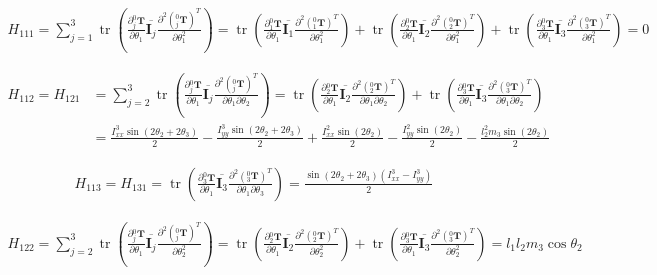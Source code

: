 \documentclass{homework}
\begin{document}
\begin{sol}
\begin{align*}
  H_{111} = \sum_{j=1}^3 \operatorname{tr} (\frac{\partial {^0_j}\mathbf{T}}{\partial \theta_1} \overline{\mathbf{I}_j} \frac{\partial^2 ({^0_j}\mathbf{T})^T}{\partial \theta_1^2}) 
          = \operatorname{tr} (\frac{\partial {^0_1}\mathbf{T}}{\partial \theta_1} \overline{\mathbf{I}_1} \frac{\partial^2 ({^0_1}\mathbf{T})^T}{\partial \theta_1^2}) + \operatorname{tr} (\frac{\partial {^0_2}\mathbf{T}}{\partial \theta_1} \overline{\mathbf{I}_2} \frac{\partial^2 ({^0_2}\mathbf{T})^T}{\partial \theta_1^2}) + \operatorname{tr} (\frac{\partial {^0_3}\mathbf{T}}{\partial \theta_1} \overline{\mathbf{I}_3} \frac{\partial^2 ({^0_3}\mathbf{T})^T}{\partial \theta_1^2})
          = 0
\end{align*}

\begin{align*}
  H_{112} = H_{121} &= \sum_{j=2}^3 \operatorname{tr} (\frac{\partial {^0_j}\mathbf{T}}{\partial \theta_1} \overline{\mathbf{I}_j} \frac{\partial^2 ({^0_j}\mathbf{T})^T}{\partial \theta_1 \partial \theta_2}) 
                    = \operatorname{tr} (\frac{\partial {^0_2}\mathbf{T}}{\partial \theta_1} \overline{\mathbf{I}_2} \frac{\partial^2 ({^0_2}\mathbf{T})^T}{\partial \theta_1 \partial \theta_2}) + \operatorname{tr} (\frac{\partial {^0_3}\mathbf{T}}{\partial \theta_1} \overline{\mathbf{I}_3} \frac{\partial^2 ({^0_3}\mathbf{T})^T}{\partial \theta_1 \partial \theta_2}) \\
                    &= \frac{I_{xx}^3 \sin(2\theta_2 + 2\theta_3)}{2} - \frac{I_{yy}^3 \sin(2\theta_2 + 2\theta_3)}{2} + \frac{I_{xx}^2 \sin(2\theta_2)}{2} - \frac{I_{yy}^2 \sin(2\theta_2)}{2} - \frac{l_2^2 m_3 \sin(2\theta_2)}{2}
\end{align*}

\begin{align*}
  H_{113} = H_{131} = \operatorname{tr} (\frac{\partial {^0_3}\mathbf{T}}{\partial \theta_1} \overline{\mathbf{I}_3} \frac{\partial^2 ({^0_3}\mathbf{T})^T}{\partial \theta_1 \partial \theta_3}) 
                    = \frac{\sin(2\theta_2 + 2\theta_3) (I_{xx}^3 - I_{yy}^3)}{2}
\end{align*}

\begin{align*}
  H_{122} = \sum_{j=2}^3 \operatorname{tr} (\frac{\partial {^0_j}\mathbf{T}}{\partial \theta_1} \overline{\mathbf{I}_j} \frac{\partial^2 ({^0_j}\mathbf{T})^T}{\partial \theta_2^2}) 
          = \operatorname{tr} (\frac{\partial {^0_2}\mathbf{T}}{\partial \theta_1} \overline{\mathbf{I}_2} \frac{\partial^2 ({^0_2}\mathbf{T})^T}{\partial \theta_2^2}) + \operatorname{tr} (\frac{\partial {^0_3}\mathbf{T}}{\partial \theta_1} \overline{\mathbf{I}_3} \frac{\partial^2 ({^0_3}\mathbf{T})^T}{\partial \theta_2^2})
          = l_1 l_2 m_3 \cos\theta_2
\end{align*}


\end{sol}
\end{document}
